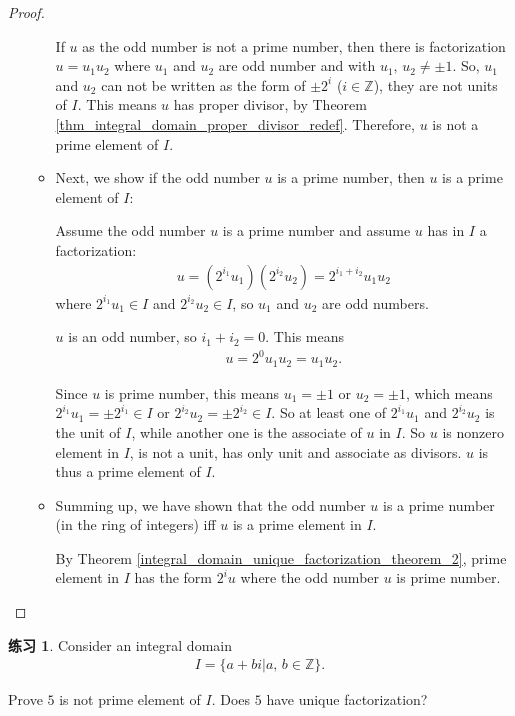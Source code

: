 \documentclass[utf8]{ctexbook}
\theoremstyle{definition}
\newtheorem{exercise}{练习}[section]
\begin{document}
\begin{proof}
\begin{enumerate}
\begin{itemize}
{If $u$ as the odd number is not a prime number, then there is factorization $u = u_1 u_2$ where $u_1$ and $u_2$ are odd number and with $u_1, \, u_2 \neq \pm 1$. So, $u_1$ and $u_2$ can not be written as the form of $\pm 2^i$ ($i \in \mathbb{Z}$), they are not units of $I$. This means $u$ has proper divisor, by Theorem \ref{thm_integral_domain_proper_divisor_redef}. Therefore, $u$ is not a prime element of $I$.}
\item{Next, we show if the odd number $u$ is a prime number, then $u$ is a prime element of $I$:

Assume the odd number $u$ is a prime number and assume $u$ has in $I$ a factorization:
\begin{align*}
u = (2^{i_1}u_1 ) ( 2^{i_2} u_2 ) = 2^{i_1 + i_2} u_1 u_2
\end{align*}
where $2^{i_1}u_1 \in I$ and $2^{i_2} u_2 \in I$, so $u_1$ and $u_2$ are odd numbers.

$u$ is an odd number, so $i_1 + i_2 =0$. This means 
\begin{align*}
u = 2^0 u_1 u_2 = u_1 u_2 .
\end{align*}

Since $u$ is prime number, this means $u_1 = \pm 1$ or $u_2 = \pm 1$, which means $2^{i_1}u_1 = \pm  2^{i_1} \in I$ or $ 2^{i_2} u_2 = \pm 2^{i_2} \in I$. So at least one of $2^{i_1}u_1$ and $2^{i_2} u_2 $ is the unit of $I$, while another one is the associate of $u$ in $I$. So $u$ is nonzero element in $I$, is not a unit, has only unit and associate as divisors. $u$ is thus a prime element of $I$. 
 }
\item{Summing up, we have shown that the odd number $u$ is a prime number (in the ring of integers) iff $u$ is a prime element in $I$. 

By Theorem \ref{integral_domain_unique_factorization_theorem_2}, prime element in $I$ has the form $2^i u$ where the odd number $u$ is prime number.}
\end{itemize}

\end{enumerate}

\end{proof}


\begin{exercise}
Consider an integral domain
\begin{align*}
I = \{ a + bi | a, \, b \in \mathbb{Z} \} .
\end{align*}

Prove $5$ is not prime element of $I$. Does $5$ have unique factorization?

\end{exercise}
\end{document}
